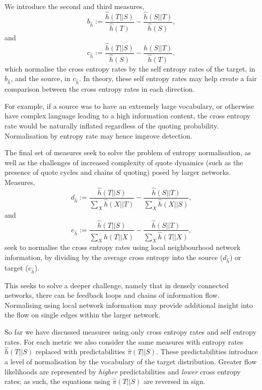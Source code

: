We introduce the second and third measures, \begin{equation}b_{\hat{h}} := \frac{\hat{h}(T||S)}{\hat{h}(T)} - \frac{\hat{h}(S||T)}{\hat{h}(S)},\end{equation}
and
\begin{equation}c_{\hat{h}} := \frac{\hat{h}(T||S)}{\hat{h}(S)} - \frac{\hat{h}(S||T)}{\hat{h}(T)},\end{equation}
which normalise the cross entropy rates by the self entropy rates of the target, in $b_{\hat{h}}$, and the source, in $c_{\hat{h}}$. In theory, these self entropy rates may help create a fair comparison between the cross entropy rates in each direction.

For example, if a source was to have an extremely large vocabulary, or otherwise have complex language leading to a high information content, the cross entropy rate would be naturally inflated regardless of the quoting probability. Normalisation by entropy rate may hence improve detection.

The final set of measures seek to solve the problem of entropy normalisation, as well as the challenges of increased complexity of quote dynamics (such as the presence of quote cycles and chains of quoting) posed by larger networks. Measures, 
\begin{equation} d_{\hat{h}} := \frac{\hat{h}{(T||S)}}{\sum_X \hat{h}(X||T)} - \frac{\hat{h}(S||T)}{\sum_X \hat{h}(X||S)},\end{equation} 
and
\begin{equation} 
e_{\hat{h}} := \frac{\hat{h}(T||S)}{\sum_X \hat{h}(T||X)} - \frac{\hat{h}(S||T)}{\sum_X \hat{h}(T||X)},\end{equation}
seek to normalise the cross entropy rates using local neighbourhood network information, by dividing by the average cross entropy into the source ($d_{\hat{h}}$) or target ($e_{\hat{h}}$). 

This seeks to solve a deeper challenge, namely that in densely connected networks, there can be feedback loops and chains of information flow. Normalising using local network information may provide additional insight into the flow on single edges within the larger network.

So far we have discussed measures using only cross entropy rates and self entropy rates. For each metric we also consider the same measures with entropy rates $\hat{h}(T||S)$ replaced with predictabilities $\hat{\pi}(T||S)$. These predictabilities introduce a level of normalisation by the vocabulary of the target distribution. Greater flow likelihoods are represented by \emph{higher} predictabilities and \emph{lower} cross entropy rates; as such, the equations using $\hat{\pi}(T||S)$ are reversed in sign.

